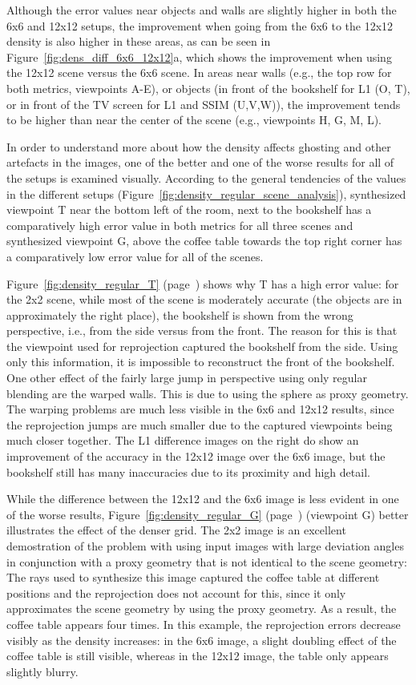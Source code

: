 Although the error values near objects and walls are slightly higher in both the 6x6 and 12x12 setups, the improvement when going from the 6x6 to the 12x12 density is also higher in these areas, as can be seen in Figure~\ref{fig:dens_diff_6x6_12x12}a, which shows the improvement when using the 12x12 scene versus the 6x6 scene. In areas near walls (e.g., the top row for both metrics, viewpoints A-E), or objects (in front of the bookshelf for L1 (O, T), or in front of the TV screen for L1 and SSIM (U,V,W)), the improvement tends to be higher than near the center of the scene (e.g., viewpoints H, G, M, L).

In order to understand more about how the density affects ghosting and other artefacts in the images, one of the better and one of the worse results for all of the setups is examined visually. According to the general tendencies of the values in the different setups (Figure~\ref{fig:density_regular_scene_analysis}), synthesized viewpoint T near the bottom left of the room, next to the bookshelf has a comparatively high error value in both metrics for all three scenes and synthesized viewpoint G, above the coffee table towards the top right corner has a comparatively low error value for all of the scenes.

Figure~\ref{fig:density_regular_T} (page~\pageref{fig:density_regular_T}) shows why T has a high error value: for the 2x2 scene, while most of the scene is moderately accurate (the objects are in approximately the right place), the bookshelf is shown from the wrong perspective, i.e., from the side versus from the front. The reason for this is that the viewpoint used for reprojection captured the bookshelf from the side. Using only this information, it is impossible to reconstruct the front of the bookshelf. One other effect of the fairly large jump in perspective using only regular blending are the warped walls. This is due to using the sphere as proxy geometry. The warping problems are much less visible in the 6x6 and 12x12 results, since the reprojection jumps are much smaller due to the captured viewpoints being much closer together. The L1 difference images on the right do show an improvement of the accuracy in the 12x12 image over the 6x6 image, but the bookshelf still has many inaccuracies due to its proximity and high detail.

While the difference between the 12x12 and the 6x6 image is less evident in one of the worse results, Figure~\ref{fig:density_regular_G} (page~\pageref{fig:density_regular_G}) (viewpoint G) better illustrates the effect of the denser grid. The 2x2 image is an excellent demostration of the problem with using input images with large deviation angles in conjunction with a proxy geometry that is not identical to the scene geometry: The rays used to synthesize this image captured the coffee table at different positions and the reprojection does not account for this, since it only approximates the scene geometry by using the proxy geometry. As a result, the coffee table appears four times. In this example, the reprojection errors decrease visibly as the density increases: in the 6x6 image, a slight doubling effect of the coffee table is still visible, whereas in the 12x12 image, the table only appears slightly blurry.

